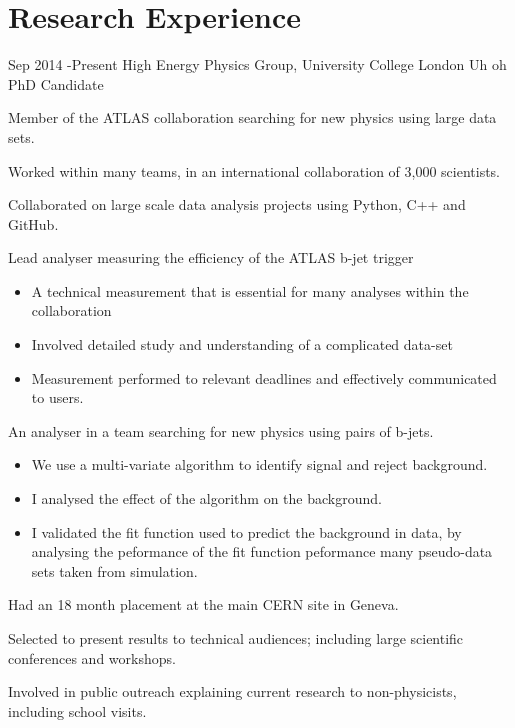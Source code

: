 \documentclass[10pt]{article} %
\begin{document}

\vspace{-2mm}
\section{Research Experience}
\job
{Sep 2014 -}{Present}
{High Energy Physics Group, University College London}
{Uh oh}
{PhD Candidate}
{
  \begin{itemize-noindent}
  \item{Member of the ATLAS collaboration searching for new physics using large data sets.}
  \item{Worked within many teams, in an international collaboration of 3,000 scientists.}
  \item{Collaborated on large scale data analysis projects using Python, C++ and GitHub.}
  \item{Lead analyser measuring the efficiency of the ATLAS b-jet trigger}
    \begin{itemize}
    \item{A technical measurement that is essential for many analyses within the collaboration}
    \item{Involved detailed study and understanding of a complicated data-set}
    \item{Measurement performed to relevant deadlines and effectively communicated to users.}
    \end{itemize}
  \item{ An analyser in a team searching for new physics using pairs of b-jets.}
   \begin{itemize}
      \item{We use a multi-variate algorithm to identify signal and reject background.}
      \item{I analysed the effect of the algorithm on the background.}
      \item{I validated the fit function used to predict the background in data,
        by analysing the peformance of the fit function peformance many pseudo-data sets taken from simulation.}
   \end{itemize}
 \item{Had an 18 month placement at the main CERN site in Geneva.} 
 \item{Selected to present results to technical audiences; including large scientific conferences and workshops.}
 \item{Involved in public outreach explaining current research to non-physicists, including school visits.}
\end{itemize-noindent}
}
\end{document}
